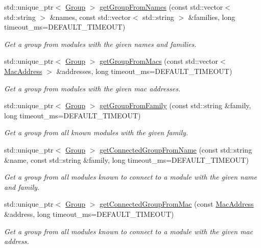 \begin{DoxyCompactItemize}
std\+::unique\+\_\+ptr$<$ \hyperlink{classhebi_1_1Group}{Group} $>$ \hyperlink{classhebi_1_1Lookup_adae9314e23d17ad53e26f146f4c256bf}{get\+Group\+From\+Names} (const std\+::vector$<$ std\+::string $>$ \&names, const std\+::vector$<$ std\+::string $>$ \&families, long timeout\+\_\+ms=D\+E\+F\+A\+U\+L\+T\+\_\+\+T\+I\+M\+E\+O\+UT)
\begin{DoxyCompactList}\small\item\em Get a group from modules with the given names and families. \end{DoxyCompactList}\item 
std\+::unique\+\_\+ptr$<$ \hyperlink{classhebi_1_1Group}{Group} $>$ \hyperlink{classhebi_1_1Lookup_aad6bf0015b82dbce0b4dde06e1b10f52}{get\+Group\+From\+Macs} (const std\+::vector$<$ \hyperlink{classhebi_1_1MacAddress}{Mac\+Address} $>$ \&addresses, long timeout\+\_\+ms=D\+E\+F\+A\+U\+L\+T\+\_\+\+T\+I\+M\+E\+O\+UT)
\begin{DoxyCompactList}\small\item\em Get a group from modules with the given mac addresses. \end{DoxyCompactList}\item 
std\+::unique\+\_\+ptr$<$ \hyperlink{classhebi_1_1Group}{Group} $>$ \hyperlink{classhebi_1_1Lookup_a61243d9e23909ecc5511258452d4396f}{get\+Group\+From\+Family} (const std\+::string \&family, long timeout\+\_\+ms=D\+E\+F\+A\+U\+L\+T\+\_\+\+T\+I\+M\+E\+O\+UT)
\begin{DoxyCompactList}\small\item\em Get a group from all known modules with the given family. \end{DoxyCompactList}\item 
std\+::unique\+\_\+ptr$<$ \hyperlink{classhebi_1_1Group}{Group} $>$ \hyperlink{classhebi_1_1Lookup_afb22de42b4310292bd9a0a5848e3f3e6}{get\+Connected\+Group\+From\+Name} (const std\+::string \&name, const std\+::string \&family, long timeout\+\_\+ms=D\+E\+F\+A\+U\+L\+T\+\_\+\+T\+I\+M\+E\+O\+UT)
\begin{DoxyCompactList}\small\item\em Get a group from all modules known to connect to a module with the given name and family. \end{DoxyCompactList}\item 
std\+::unique\+\_\+ptr$<$ \hyperlink{classhebi_1_1Group}{Group} $>$ \hyperlink{classhebi_1_1Lookup_ad77bc157e336ee526157d5b31eb6bc22}{get\+Connected\+Group\+From\+Mac} (const \hyperlink{classhebi_1_1MacAddress}{Mac\+Address} \&address, long timeout\+\_\+ms=D\+E\+F\+A\+U\+L\+T\+\_\+\+T\+I\+M\+E\+O\+UT)
\begin{DoxyCompactList}\small\item\em Get a group from all modules known to connect to a module with the given mac address. \end{DoxyCompactList}\end{DoxyCompactItemize}


